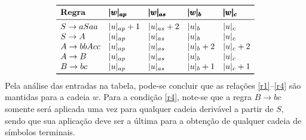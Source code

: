 \documentclass[12pt]{article}
\begin{document}
\begin{tcolorbox}
\begin{description}
		$$
		\begin{array}{lllll}
   \toprule
		 \textbf{Regra} & \pmb{|w|_{ap}} & \pmb{|w|_{as}} & \pmb{|w|_b} & \pmb{|w|_c} \\ 
 		\midrule
 		S \to aSaa     & |u|_{ap}+1 & |u|_{as}+2 & |u|_b    & |u|_c \\ 
 		S \to A        & |u|_{ap}   & |u|_{as}   & |u|_b    & |u|_c \\ 
 		A \to bbAcc    & |u|_{ap}   & |u|_{as}   & |u|_b+2  & |u|_c+2 \\ 
 		A \to B        & |u|_{ap}   & |u|_{as}   & |u|_b    & |u|_c \\ 
 		B \to bc       & |u|_{ap}   & |u|_{as}   & |u|_b+1  & |u|_c+1 \\  
 		\bottomrule 
		\end{array} 
		$$
	Pela análise das entradas na tabela, pode-se concluir que as relações \ref{r1}--\ref{r4} são mantidas para a cadeia $w$. Para a condição \ref{r4}, note-se que a regra $B \to bc$ somente será aplicada uma vez para qualquer cadeia derivável a partir de $S$, sendo que sua aplicação deve ser a última para a obtenção de qualquer cadeia de símbolos terminais.
 \end{description}
\end{tcolorbox}
\end{document}
